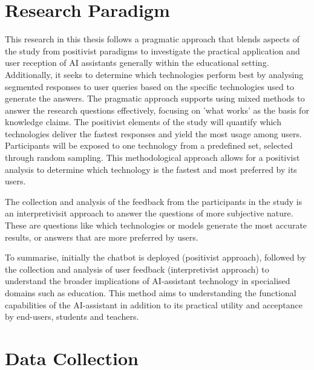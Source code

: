 \section{Research Paradigm}
\label{sec:researchParadigm}




This research in this thesis follows a pragmatic approach that blends aspects of the study from positivist paradigms to investigate the practical application and user reception of AI assistants generally within the educational setting. Additionally, it seeks to determine which technologies perform best by analysing segmented responses to user queries based on the specific technologies used to generate the answers.
The pragmatic approach supports using mixed methods to answer the research questions effectively, focusing on 'what works' as the basis for knowledge claims. The positivist elements of the study will quantify which technologies deliver the fastest responses and yield the most usage among users. Participants will be exposed to one technology from a predefined set, selected through random sampling. This methodological approach allows for a positivist analysis to determine which technology is the fastest and most preferred by its users.


The collection and analysis of the feedback from the participants in the study is an interpretivisit approach to answer the questions of more subjective nature. These are questions like which technologies or models generate the most accurate results, or answers that are more preferred by users.


To summarise, initially the chatbot is deployed (positivist approach), followed by the collection and analysis of user feedback (interpretivist approach) to understand the broader implications of AI-assistant technology in specialised domains such as education. This method aims to understanding the functional capabilities of the AI-assistant in addition to its practical utility and acceptance by end-users, students and teachers.




\section{Data Collection}
\label{sec:dataCollection}


